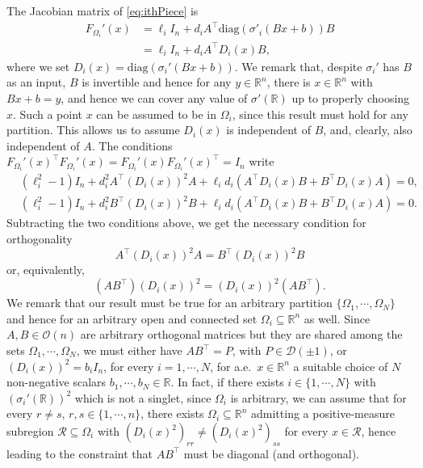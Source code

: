 \documentclass{article}
\newcommand{\R}{\mathbb{R}}
\theoremstyle{plain}
\theoremstyle{definition}
\theoremstyle{definition}
\theoremstyle{remark}
\theoremstyle{definition}
\theoremstyle{definition}
\theoremstyle{remark}
\numberwithin{equation}{section}
\begin{document}
The Jacobian matrix of \eqref{eq:ithPiece} is
\[
\begin{aligned}
F_{\Omega_i}'(x) & = \ell_i I_n + d_i A^\top \mathrm{diag}(\sigma'_i(Bx + b))B\\
& = \ell_i I_n + d_iA^\top D_i(x) B,
\end{aligned}
\]
where we set $D_i(x) = \mathrm{diag}(\sigma_i'(Bx+b))$. We remark that, despite $\sigma_i'$ has $B$ as an input, $B$ is invertible and hence for any $y\in\mathbb{R}^n$, there is $x\in\mathbb{R}^n$ with $Bx+b=y$, and hence we can cover any value of $\sigma'(\mathbb{R})$ up to properly choosing $x$. Such a point $x$ can be assumed to be in $\Omega_i$, since this result must hold for any partition. This allows us to assume $D_i(x)$ is independent of $B$, and, clearly, also independent of $A$. The conditions $F_{\Omega_i}'(x)^\top F_{\Omega_i}'(x) = F_{\Omega_i}'(x)F_{\Omega_i}'(x)^\top = I_n$ write
\[
\begin{aligned}
&(\ell^2_i - 1) I_n + d_i^2A^\top (D_i(x))^2 A + \ell_i d_i(A^\top D_i(x)B+ B^\top D_i(x)A) = 0,\\
&(\ell^2_i - 1) I_n + d_i^2B^\top (D_i(x))^2 B + \ell_i d_i (A^\top D_i(x)B+ B^\top D_i(x)A) = 0.
\end{aligned}
\]
Subtracting the two conditions above, we get the necessary condition for orthogonality
\[
A^\top (D_i(x))^2 A = B^\top (D_i(x))^2 B
\]
or, equivalently,
\begin{equation}\label{eq:commuting}
(AB^\top) (D_i(x))^2 = (D_i(x))^2 (AB^\top).
\end{equation}
We remark that our result must be true for an arbitrary partition $\{\Omega_1,\cdots,\Omega_N\}$ and hence for an arbitrary open and connected set $\Omega_i\subseteq\mathbb{R}^n$ as well. Since $A, B \in \mathcal{O}(n)$ are arbitrary orthogonal matrices but they are shared among the sets $\Omega_1,\cdots,\Omega_N$, we must either have $AB^\top = P$, with $P \in \mathcal{D}(\pm1)$, or $(D_i(x))^2 = b_i I_n$, for every $i=1,\cdots,N$, for a.e.\, $x\in\mathbb{R}^n$ a suitable choice of $N$ non-negative scalars $b_1,\cdots,b_N\in\R$. In fact, if there exists $i\in\{1,\cdots,N\}$ with $(\sigma_i'(\mathbb{R}))^2$ which is not a singlet, since $\Omega_i$ is arbitrary, we can assume that for every $r\neq s$, $r,s\in\{1,\cdots,n\}$, there exists $\Omega_i\subseteq\mathbb{R}^n$ admitting a positive-measure subregion $\mathcal{R}\subseteq\Omega_i$ with $(D_i(x)^2)_{rr}\neq (D_i(x)^2)_{ss}$ for every $x\in\mathcal{R}$, hence leading to the constraint that $AB^\top$ must be diagonal (and orthogonal).
\end{document}
